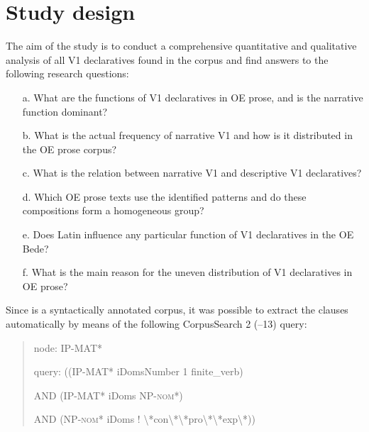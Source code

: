 \documentclass[output=paper,colorlinks,citecolor=brown]{langscibook}
\begin{document}
\section{Study design}
\label{sec:cichosz:3}

The aim of the study is to conduct a comprehensive quantitative and qualitative analysis of all V1 declaratives found in the  corpus \citep{TaylorTaylor2003} and find answers to the following research questions:

\begin{itemize}
\item[a.] 
What are the functions of V1 declaratives in OE prose, and is the narrative function dominant?
\item[b.] 
What is the actual frequency of narrative V1 and how is it distributed in the OE prose corpus?
\item[c.]
What is the relation between narrative V1 and descriptive V1 declaratives?
\item[d.] 
Which OE prose texts use the identified patterns and do these compositions form a homogeneous group?
\item[e.] 
Does Latin influence any particular function of V1 declaratives in the OE Bede?
\item[f.]
What is the main reason for the uneven distribution of V1 declaratives in OE prose?
\end{itemize}

Since  is a syntactically annotated corpus, it was possible to extract the clauses automatically by means of the following CorpusSearch 2 (\citealt{Randall2005}--13) query:

\begin{quote}
node: IP-MAT*

query:   ((IP-MAT* iDomsNumber 1 finite\_verb)

    AND (IP-MAT* iDoms NP-\textsc{nom}*)

    AND (NP-\textsc{nom}* iDoms ! {\textbackslash}*con{\textbackslash}*{\textbar}{\textbackslash}*pro{\textbackslash}*{\textbar}{\textbackslash}*exp{\textbackslash}*))    
\end{quote}
\end{document}
